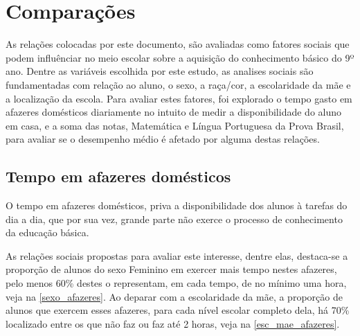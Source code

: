 

\chapter{Comparações}

As relações colocadas por este documento, são avaliadas como 
fatores sociais que podem influênciar no meio escolar sobre a 
aquisição do conhecimento básico do 9º ano. Dentre as variáveis
escolhida por este estudo, as analises sociais são fundamentadas
com relação ao aluno, o sexo, a raça/cor, a escolaridade da mãe e 
a localização da escola. Para avaliar estes fatores, foi explorado
o tempo gasto em afazeres domésticos diariamente no intuito de medir
a disponibilidade do aluno em casa, e a soma das notas, Matemática e
Língua Portuguesa da Prova Brasil, para avaliar se o desempenho médio é 
afetado por alguma destas relações.

\section{Tempo em afazeres domésticos}

O tempo em afazeres domésticos, priva a disponibilidade dos alunos à 
tarefas do dia a dia, que por sua vez, grande parte não exerce o processo 
de conhecimento da educação básica.

As relações sociais propostas para avaliar este interesse, dentre elas,
destaca-se a proporção de alunos do sexo Feminino em exercer mais tempo nestes
afazeres, pelo menos 60\% destes o representam, em cada tempo, de no mínimo uma 
hora, veja na \autoref{sexo_afazeres}. Ao deparar com a escolaridade da mãe,
a proporção de alunos que exercem esses afazeres, para cada nível escolar
completo dela, há 70\% localizado entre os que não faz ou faz até 2 horas,
veja na \autoref{esc_mae_afazeres}.

